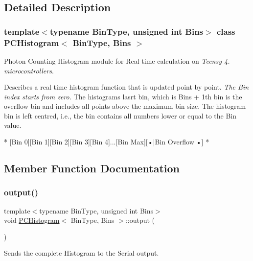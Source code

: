 \subsection{Detailed Description}
\subsubsection*{template$<$typename Bin\+Type, unsigned int Bins$>$\newline
class P\+C\+Histogram$<$ Bin\+Type, Bins $>$}

Photon Counting Histogram module for Real time calculation on {\itshape Teensy 4. microcontrollers}. 

Describes a real time histogram function that is updated point by point. {\itshape The Bin index starts from zero.} The histogram\textquotesingle{}s lasrt bin, which is {\ttfamily Bins + 1}th bin is the overflow bin and includes all points above the maximum bin size. The histogram bin is left centred, i.\+e., the bin contains all numbers lower or equal to the Bin value. \begin{DoxyVerb}* [Bin 0][Bin 1][Bin 2][Bin 3][Bin 4]...[Bin Max][•|Bin Overflow|•]
* \end{DoxyVerb}
 

\subsection{Member Function Documentation}
\mbox{\label{classPCHistogram_af4391ac8ad3f4d9865ee6335fb563b4c}} 
\subsubsection{\texorpdfstring{output()}{output()}}
{\footnotesize\ttfamily template$<$typename Bin\+Type, unsigned int Bins$>$ \\
void \hyperlink{classPCHistogram}{P\+C\+Histogram}$<$ Bin\+Type, Bins $>$\+::output (\begin{DoxyParamCaption}{ }\end{DoxyParamCaption})\hspace{0.3cm}{\ttfamily [inline]}}



Sends the complete Histogram to the Serial output. 

\mbox{\label{classPCHistogram_a0885e66d0de46bd16b72b870d7f410fc}} 
